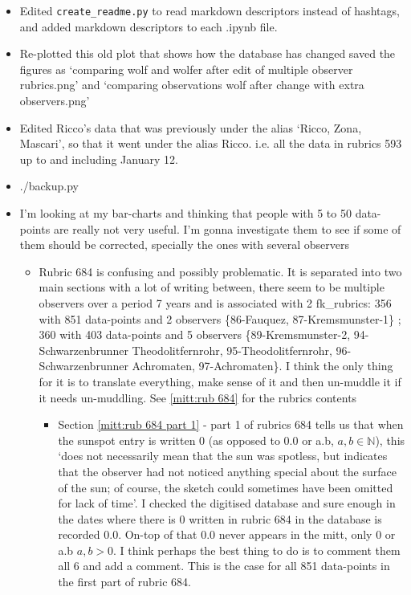 \documentclass[12pt]{article}
\newcommand{\N}{\mathbb{N}}
\begin{document}
\begin{itemize}
    \item Edited \texttt{create\_readme.py} to read markdown descriptors instead of hashtags, and added markdown descriptors to each .ipynb file.
    \item Re-plotted this old plot that shows how the database has changed saved the figures as `comparing wolf and wolfer after edit of multiple observer rubrics.png' and `comparing observations wolf after change with extra observers.png'
    \item Edited Ricco's data that was previously under the alias `Ricco, Zona, Mascari', so that it went under the alias Ricco. i.e. all the data in rubrics 593 up to and including January 12.
    \item ./backup.py
    \item I'm looking at my bar-charts and thinking that people with 5 to 50 data-points are really not very useful. I'm gonna investigate them to see if some of them should be corrected, specially the ones with several observers
    \begin{itemize}
        \item Rubric 684 is confusing and possibly problematic. It is separated into two main sections with a lot of writing between, there seem to be multiple observers over a period 7 years and is associated with 2 fk\_rubrics: 356 with 851 data-points and 2 observers \{86-Fauquez, 87-Kremsmunster-1\} ; 360 with 403 data-points and 5 observers \{89-Kremsmunster-2, 94-Schwarzenbrunner Theodolitfernrohr, 95-Theodolitfernrohr, 96-Schwarzenbrunner Achromaten, 97-Achromaten\}. I think the only thing for it is to translate everything, make sense of it and then un-muddle it if it needs un-muddling. See \ref{mitt:rub 684} for the rubrics contents
        \begin{itemize}
            \item Section \ref{mitt:rub 684 part 1} - part 1 of rubrics 684 tells us that when the sunspot entry is written 0 (as opposed to 0.0 or a.b, $a,b\in\N$), this `does not necessarily mean that the sun was spotless, but indicates that the observer had not noticed anything special about the surface of the sun; of course, the sketch could sometimes have been omitted for lack of time'. I checked the digitised database and sure enough in the dates where there is 0 written in rubric 684 in the database is recorded 0.0. On-top of that 0.0 never appears in the mitt, only 0 or a.b $a,b>0$. I think perhaps the best thing to do is to comment them all 6 and add a comment. This is the case for all 851 data-points in the first part of rubric 684. 

\end{itemize}
\end{itemize}
\end{itemize}
\end{document}
